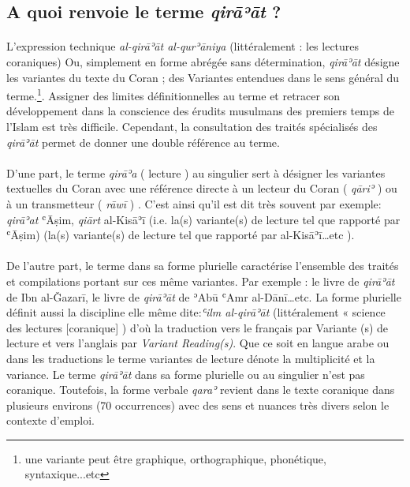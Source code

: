 \documentclass[a4paper,12pt]{report}
\begin{document}
\begin{itemize}
 
\section{A quoi renvoie le terme \textit{qirāʾāt} ? }



\paragraph{}
L’expression technique \textit{al-qirāʾāt al-qurʾāniya} (littéralement : les lectures coraniques) Ou, simplement en forme  abrégée sans détermination,  \textit{qirāʾāt  } désigne les variantes du texte du Coran ; des Variantes entendues dans le sens général du terme.\footnote{ une variante peut être graphique, orthographique, phonétique, syntaxique...etc}. Assigner des limites définitionnelles au terme  et retracer son développement dans la conscience des érudits musulmans des premiers temps de l’Islam est très difficile. Cependant, la consultation des traités spécialisés des \textit{qirāʾāt }  permet de  donner  une double référence au terme.
\paragraph{}
D'une part,  le terme \textit{qirāʾa} ( lecture  )  au singulier sert à désigner les variantes textuelles du Coran  avec une référence directe à un  lecteur du Coran ( \textit{qāriʾ} ) ou à un transmetteur ( \textit{rāwī }) . C'est ainsi qu'il est dit très souvent par exemple:  \textit{qirāʾat} ʿĀṣim, \textit{qiārt}  al-Kisāʾī  (i.e. la(s) variante(s) de lecture tel que rapporté par ʿĀṣim) (la(s) variante(s) de lecture tel que rapporté par  al-Kisāʾī…etc ). 
\paragraph{}
De l'autre part,  le terme dans sa forme plurielle caractérise l'ensemble des traités et compilations portant sur ces même variantes. Par exemple : le livre de \textit{qirāʾāt} de Ibn al-Ǧazarī, le livre de \textit{qirāʾāt} de ʾAbū ʿAmr al-Dānī…etc. La forme plurielle définit aussi  la discipline elle même dite:\textit{ʿilm  al-qirāʾāt} (littéralement « science des lectures [coranique] ) d'où la traduction vers le français par  Variante (s) de lecture et vers l'anglais par \textit{Variant Reading(s)}. Que ce soit en langue arabe ou dans les traductions le terme variantes de lecture  dénote la multiplicité et la variance.  Le terme \textit{qirāʾāt}  dans sa forme plurielle ou au singulier n'est pas coranique. Toutefois, la forme verbale \textit{qaraʾ} revient dans le texte coranique dans plusieurs environs (70 occurrences)  avec  des sens et nuances très divers selon le contexte d'emploi. 


\end{itemize}
\end{document}
